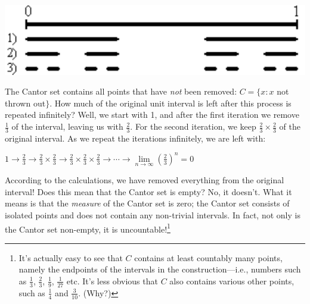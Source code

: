 \documentclass[11pt,fleqn]{article}
\begin{document}
\includegraphics[bb = -40 0 0 75, scale = 0.7]{cantorset}

The Cantor set contains all points that have {\it not\/} been removed: $C = \{x : x$ not thrown out$\}$.
How much of the original unit interval is left after this process is repeated infinitely? Well, we start
with 1, and after the first iteration we remove $\frac{1}{3}$ of the interval, leaving us with $\frac{2}{3}$.
For the second iteration, we keep $\frac{2}{3}\times\frac{2}{3}$ of the original interval. As we repeat the
iterations infinitely, we are left with:

\vspace{.1cm}
$1 \longrightarrow \frac{2}{3} \longrightarrow \frac{2}{3} \times \frac{2}{3} \longrightarrow \frac{2}{3} \times \frac{2}{3} \times \frac{2}{3} \longrightarrow \cdots \longrightarrow \mathop {\lim }\limits_{n \to \infty } (\frac{2}{3})^n = 0$

According to the calculations, we have removed everything from the original interval!  Does this
mean that the Cantor set is empty?  No, it doesn't.  
What it means is that the {\it measure\/} of
the Cantor set is zero; the Cantor set consists of isolated points and does not contain any 
non-trivial intervals.  In fact, not only is the Cantor set non-empty, it is 
uncountable!\footnote{It's actually easy to see that $C$ contains at least countably many 
points, namely the endpoints of the intervals in the construction---i.e., numbers such as 
$\frac{1}{3}$, $\frac{2}{3}$, $\frac{1}{9}$, $\frac{1}{27}$ etc.  It's less obvious that $C$ also
contains various other points, such as $\frac{1}{4}$ and $\frac{3}{10}$.  (Why?)}
\end{document}
